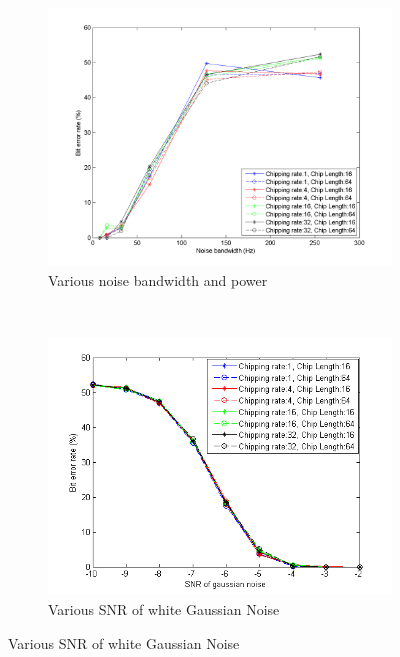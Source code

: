		\begin{figure}[H]
			\centering
			\begin{subfigure}[b]{0.5\textwidth}
				\includegraphics[width=\textwidth]{imgs/results/plot_mode_fhss-test_bandwidthAndPower-rep_20-dataRate_8-dataLength_128.png}
				\caption{Various noise bandwidth and power}
				\label{fig:fhss_bandwidth}
			\end{subfigure}%
			~
			\begin{subfigure}[b]{0.5\textwidth}
				\includegraphics[width=\textwidth]{imgs/results/plot_mode_fhss-test_gaussianSNR-rep_20-dataRate_8-dataLength_128_fixedlegend.png}
				\caption{Various SNR of white Gaussian Noise}
				\label{fig:fhss_gaussian}
			\end{subfigure}
		\end{figure}
		
